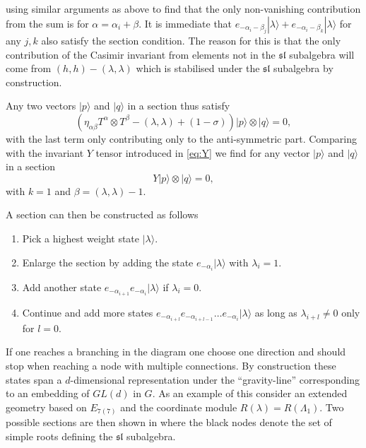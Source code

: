 using similar arguments as above to find that the only non-vanishing contribution from the sum is for $\alpha=\alpha_i+\beta$. It is immediate that $e_{-\alpha_i-\beta_j}|\lambda\rangle+e_{-\alpha_i-\beta_k}|\lambda\rangle$ for any $j,k$ also satisfy the section condition. The reason for this is that the only contribution of the Casimir invariant from elements not in the $\mathfrak{sl}$ subalgebra will come from $(h,h)-(\lambda,\lambda)$ which is stabilised under the $\mathfrak{sl}$ subalgebra by construction.

Any two vectors $|p\rangle$ and $|q\rangle$ in a section thus satisfy 
\begin{equation}
    \left(\eta_{\alpha\beta}T^\alpha\otimes T^\beta-(\lambda,\lambda)+(1-\sigma)\right)|p\rangle\otimes|q\rangle = 0,
\end{equation}
with the last term only contributing only to the anti-symmetric part. Comparing with the invariant $Y$ tensor introduced in \eqref{eq:Y} we find for any vector $|p\rangle$ and $|q\rangle$ in a section 
\begin{equation}
    Y|p\rangle\otimes|q\rangle = 0,
\end{equation}
with $k=1$ and $\beta=(\lambda,\lambda)-1$. 

A section can then be constructed as follows 
\begin{enumerate}
    \item Pick a highest weight state $|\lambda\rangle$.
    \item Enlarge the section by adding the state $e_{-\alpha_i}|\lambda\rangle$ with $\lambda_i=1$.
    \item Add another state $e_{-\alpha_{i+1}}e_{-\alpha_{i}}|\lambda\rangle$ if $\lambda_i=0$. 
    \item Continue and add more states $e_{-\alpha_{i+l}}e_{-\alpha_{i+l-1}}\ldots e_{-\alpha_{i}}|\lambda\rangle$ as long as $\lambda_{i+l}\neq 0$ only for $l=0$.
\end{enumerate}
If one reaches a branching in the diagram one choose one direction and should stop when reaching a node with multiple connections. By construction these states span a $d$-dimensional representation under the ``gravity-line'' corresponding to an embedding of $GL(d)$ in $G$. As an example of this consider an extended geometry based on $E_{7(7)}$ and the coordinate module $R(\lambda)=R(\Lambda_1)$. Two possible sections are then shown in  where the black nodes denote the set of simple roots defining the $\mathfrak{sl}$ subalgebra. 

